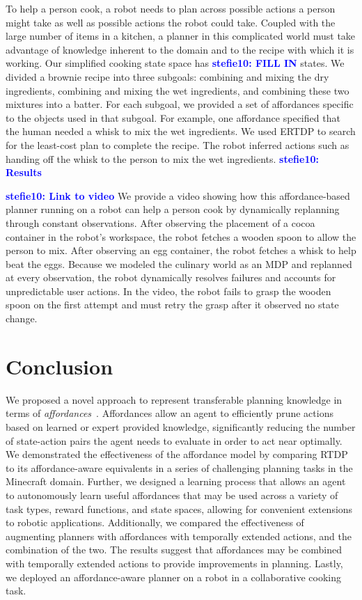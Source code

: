 \documentclass[letterpaper]{article}
\newcommand{\stnote}[1]{\textcolor{Blue}{\textbf{stefie10: #1}}}
\begin{document}
To help a person cook, a robot needs to plan across possible actions a
person might take as well as possible actions the robot could take.
Coupled with the large number of items in a kitchen, a planner in this
complicated world must take advantage of knowledge inherent to the
domain and to the recipe with which it is working.  Our simplified
cooking state space has \stnote{FILL IN} states.  We divided a brownie
recipe into three subgoals: combining and mixing the dry ingredients,
combining and mixing the wet ingredients, and combining these two
mixtures into a batter. For each subgoal, we provided a set of
affordances specific to the objects used in that subgoal.  For
example, one affordance specified that the human needed a whisk to mix
the wet ingredients.  We used ERTDP to search for the least-cost plan
to complete the recipe.  The robot inferred actions such as handing
off the whisk to the person to mix the wet ingredients.
\stnote{Results}

\stnote{Link to video}
We provide a video showing how this affordance-based planner running
on a robot can help a person cook by dynamically replanning through
constant observations. After observing the placement of a cocoa
container in the robot's workspace, the robot fetches a wooden spoon
to allow the person to mix. After observing an egg container, the
robot fetches a whisk to help beat the eggs. Because we modeled the
culinary world as an MDP and replanned at every observation, the robot
dynamically resolves failures and accounts for unpredictable user
actions. In the video, the robot fails to grasp the wooden spoon on
the first attempt and must retry the grasp after it observed no state
change.

\section{Conclusion}
\label{sec:conclusion}
We proposed a novel approach to represent transferable planning
knowledge in terms of {\em affordances}~\cite{gibson77}. Affordances
allow an agent to efficiently prune actions based on learned or expert
provided knowledge, significantly reducing the number of state-action
pairs the agent needs to evaluate in order to act near optimally. We
demonstrated the effectiveness of the affordance model by comparing
RTDP to its affordance-aware equivalents in a series of challenging
planning tasks in the Minecraft domain. Further, we designed a
learning process that allows an agent to autonomously learn useful
affordances that may be used across a variety of task types, reward
functions, and state spaces, allowing for convenient extensions to
robotic applications.  Additionally, we compared the effectiveness of
augmenting planners with affordances with temporally extended actions,
and the combination of the two. The results suggest that affordances
may be combined with temporally extended actions to provide
improvements in planning.  Lastly, we deployed an affordance-aware
planner on a robot in a collaborative cooking task.
\end{document}
